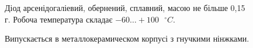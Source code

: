 \documentclass[a4paper,14pt]{extreport}
\begin{document}
\begin{figure}
\vspace{-0.7 cm}
\parbox{12cm}{%
  \begin{tcolorbox}[width=12cm,right=0.5cm]
  Діод арсенідогаліевий, обернений, сплавний, масою не більше 0,15 г. Робоча температура складає $-60\ldots+100 \text{ }^{ \circ}C$.

  Випускається в металлокерамическом корпусі з гнучкими нінжками.


  \end{tcolorbox}}
\end{figure}

\vspace{0.5 cm}\par
{}\par
\vspace{0.2 cm}\par
{}\par
\vspace{0.2 cm}\par
{}\par
\vspace{0.2 cm}\par
{}\par
\vspace{0.2 cm}\par
{}\par
\vspace{0.2 cm}\par
{}\par
\vspace{0.5 cm}\par
\end{document}
